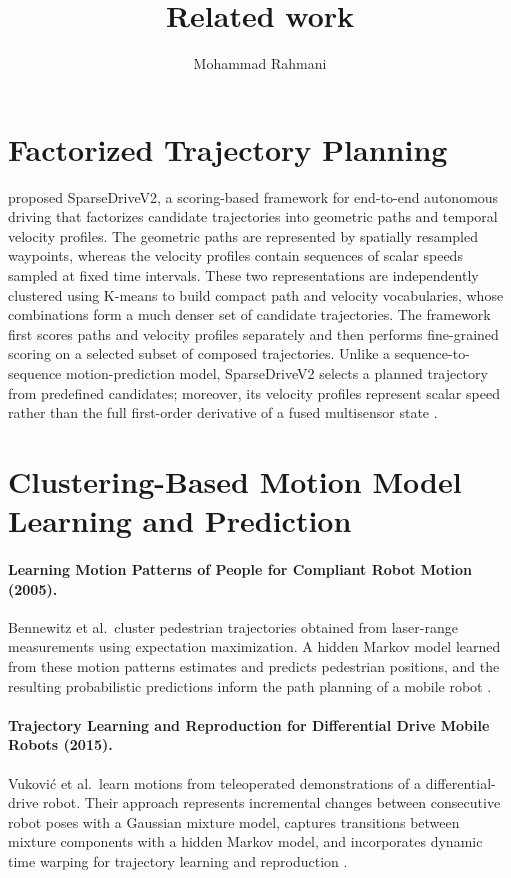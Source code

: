 \documentclass[a4paper]{article}
\title{Related work}
\date{}
\author{Mohammad Rahmani}
\begin{document}
   \maketitle

   \section{Factorized Trajectory Planning}
      \cite{sun-2026-sparsedrivev2-scoring-is-all-you-need-for-end-to-end-autonomous-driving} proposed SparseDriveV2, a scoring-based framework for end-to-end autonomous driving that factorizes candidate trajectories into geometric paths and temporal velocity profiles. The geometric paths are represented by spatially resampled waypoints, whereas the velocity profiles contain sequences of scalar speeds sampled at fixed time intervals. These two representations are independently clustered using K-means to build compact path and velocity vocabularies, whose combinations form a much denser set of candidate trajectories. The framework first scores paths and velocity profiles separately and then performs fine-grained scoring on a selected subset of composed trajectories. Unlike a sequence-to-sequence motion-prediction model, SparseDriveV2 selects a planned trajectory from predefined candidates; moreover, its velocity profiles represent scalar speed rather than the full first-order derivative of a fused multisensor state .

   
   \section{Clustering-Based Motion Model Learning and Prediction}

   \paragraph{Learning Motion Patterns of People for Compliant Robot Motion (2005).}
   Bennewitz et al.\ cluster pedestrian trajectories obtained from laser-range measurements using expectation maximization. A hidden Markov model learned from these motion patterns estimates and predicts pedestrian positions, and the resulting probabilistic predictions inform the path planning of a mobile robot \cite{bennewitz-2005-learning-motion-patterns-of-people-for-compliant-robot-motion}.

   \paragraph{Trajectory Learning and Reproduction for Differential Drive Mobile Robots (2015).}
   Vukovi\'c et al.\ learn motions from teleoperated demonstrations of a differential-drive robot. Their approach represents incremental changes between consecutive robot poses with a Gaussian mixture model, captures transitions between mixture components with a hidden Markov model, and incorporates dynamic time warping for trajectory learning and reproduction \cite{vukovic-2015-trajectory-learning-and-reproduction-for-differential-drive-mobile-robots}.
\end{document}
